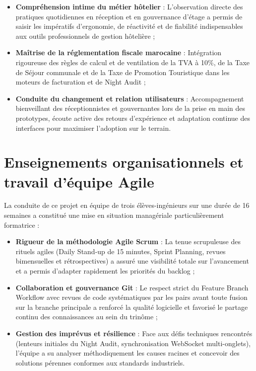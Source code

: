 \begin{itemize}
    \item \textbf{Compréhension intime du métier hôtelier} : L'observation directe des pratiques quotidiennes en réception et en gouvernance d'étage a permis de saisir les impératifs d'ergonomie, de réactivité et de fiabilité indispensables aux outils professionnels de gestion hôtelière ;
    \item \textbf{Maîtrise de la réglementation fiscale marocaine} : Intégration rigoureuse des règles de calcul et de ventilation de la TVA à 10\%, de la Taxe de Séjour communale et de la Taxe de Promotion Touristique dans les moteurs de facturation et de Night Audit ;
    \item \textbf{Conduite du changement et relation utilisateurs} : Accompagnement bienveillant des réceptionnistes et gouvernantes lors de la prise en main des prototypes, écoute active des retours d'expérience et adaptation continue des interfaces pour maximiser l'adoption sur le terrain.
\end{itemize}

\section{Enseignements organisationnels et travail d'équipe Agile}

La conduite de ce projet en équipe de trois élèves-ingénieurs sur une durée de 16 semaines a constitué une mise en situation managériale particulièrement formatrice :

\begin{itemize}
    \item \textbf{Rigueur de la méthodologie Agile Scrum} : La tenue scrupuleuse des rituels agiles (Daily Stand-up de 15 minutes, Sprint Planning, revues bimensuelles et rétrospectives) a assuré une visibilité totale sur l'avancement et a permis d'adapter rapidement les priorités du backlog ;
    \item \textbf{Collaboration et gouvernance Git} : Le respect strict du Feature Branch Workflow avec revues de code systématiques par les pairs avant toute fusion sur la branche principale a renforcé la qualité logicielle et favorisé le partage continu des connaissances au sein du trinôme ;
    \item \textbf{Gestion des imprévus et résilience} : Face aux défis techniques rencontrés (lenteurs initiales du Night Audit, synchronisation WebSocket multi-onglets), l'équipe a su analyser méthodiquement les causes racines et concevoir des solutions pérennes conformes aux standards industriels.
\end{itemize}

